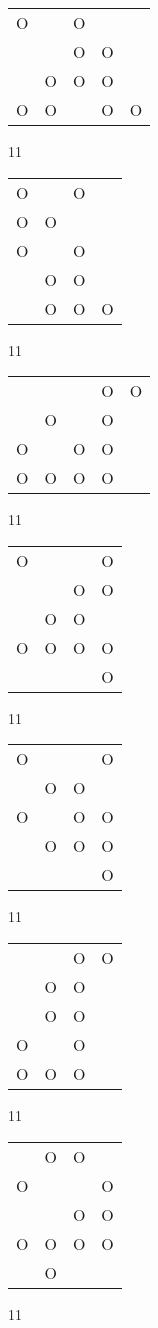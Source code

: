 \begin{tabular}{|m{0.2cm}m{0.2cm}m{0.2cm}m{0.2cm}m{0.2cm}|}\hline
O& &O& & \\
 & &O&O& \\
 &O&O&O& \\
O&O& &O&O\\
\hline\end{tabular}11
\begin{tabular}{|m{0.2cm}m{0.2cm}m{0.2cm}m{0.2cm}|}\hline
O& &O& \\
O&O& & \\
O& &O& \\
 &O&O& \\
 &O&O&O\\
\hline\end{tabular}11
\begin{tabular}{|m{0.2cm}m{0.2cm}m{0.2cm}m{0.2cm}m{0.2cm}|}\hline
 & & &O&O\\
 &O& &O& \\
O& &O&O& \\
O&O&O&O& \\
\hline\end{tabular}11
\begin{tabular}{|m{0.2cm}m{0.2cm}m{0.2cm}m{0.2cm}|}\hline
O& & &O\\
 & &O&O\\
 &O&O& \\
O&O&O&O\\
 & & &O\\
\hline\end{tabular}11
\begin{tabular}{|m{0.2cm}m{0.2cm}m{0.2cm}m{0.2cm}|}\hline
O& & &O\\
 &O&O& \\
O& &O&O\\
 &O&O&O\\
 & & &O\\
\hline\end{tabular}11
\begin{tabular}{|m{0.2cm}m{0.2cm}m{0.2cm}m{0.2cm}|}\hline
 & &O&O\\
 &O&O& \\
 &O&O& \\
O& &O& \\
O&O&O& \\
\hline\end{tabular}11
\begin{tabular}{|m{0.2cm}m{0.2cm}m{0.2cm}m{0.2cm}|}\hline
 &O&O& \\
O& & &O\\
 & &O&O\\
O&O&O&O\\
 &O& & \\
\hline\end{tabular}11
